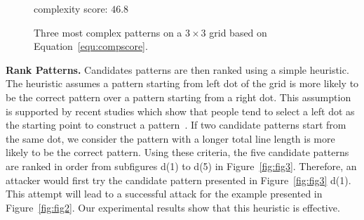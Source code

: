 \begin{figure}[!t]
{\begin{minipage}[b]{0.12\textwidth}
                \centering \footnotesize complexity score: $46.8$
                \end{minipage}
            }
            \vspace{-2mm}
            \caption{Three most complex patterns on a $3\times 3$ grid based on Equation~\ref{equ:compscore}.}
            \vspace{-2mm}
            \label{fig:most complex patterns}
        \end{figure}


        \vspace{2mm}
        \noindent \textbf{Rank Patterns.} Candidates patterns are then ranked using a simple
        heuristic. The heuristic assumes a pattern starting from
        left dot of the grid is more likely to be the correct pattern over a
         pattern starting from a right dot. This assumption is supported
        by recent studies which show that people tend to select a left dot as the starting point
        to construct a pattern~\cite{uellenbeck2013quantifying,alpnorway}.
         If two candidate patterns
         start from the same dot, we consider the pattern with a
        longer total line length
        is more likely to be the correct pattern. Using these criteria,
        the five candidate patterns are ranked in order from subfigures d(1) to d(5) in
        Figure~\ref{fig:fig3}. Therefore, an attacker would first try the candidate
        pattern presented in Figure~\ref{fig:fig3} d(1).  This attempt will lead to a
        successful attack for the example presented in Figure~\ref{fig:fig2}. Our experimental results show that
        this heuristic is effective.


